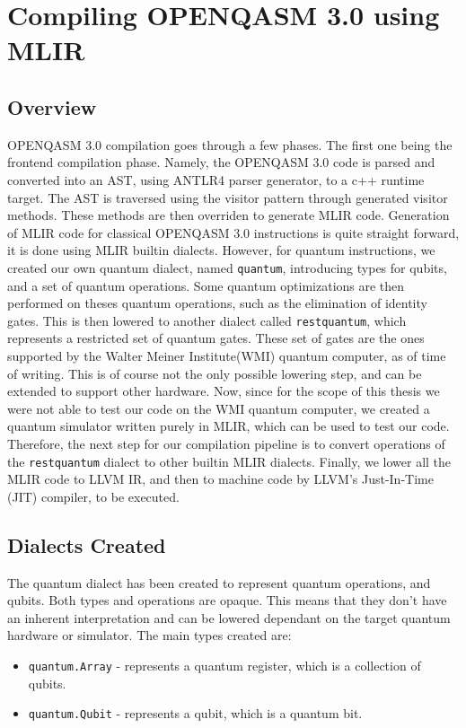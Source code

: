 \section{Compiling OPENQASM 3.0 using MLIR}
\subsection{Overview}
OPENQASM 3.0 compilation goes through a few phases.
The first one being the frontend compilation phase.
Namely, the OPENQASM 3.0 code is parsed and converted into an AST,
using ANTLR4 parser generator, to a c++ runtime target.
The AST is traversed using the visitor pattern through generated visitor methods.
These methods are then overriden to generate MLIR code.
Generation of MLIR code for classical OPENQASM 3.0 instructions is quite straight forward, it 
is done using MLIR builtin dialects. However, for quantum instructions, we created our 
own quantum dialect, named \texttt{quantum}, introducing types for qubits, and a set of quantum operations.
Some quantum optimizations are then performed on theses quantum operations, such as the elimination of identity gates.
This is then lowered to another dialect called \texttt{restquantum}, which represents a restricted set of quantum gates.
These set of gates are the ones supported by the Walter Meiner Institute(WMI) quantum computer, as of time of writing.
This is of course not the only possible lowering step, and can be extended to support other hardware.
Now, since for the scope of this thesis we were not able to test our code on the WMI quantum computer,
we created a quantum simulator written purely in MLIR, which can be used to test our code.
Therefore, the next step for our compilation pipeline is to convert operations of  
the \texttt{restquantum} dialect to other 
builtin MLIR dialects. Finally, we lower all the MLIR code to LLVM IR, 
and then to machine code by LLVM's Just-In-Time (JIT) compiler, to be executed.
\subsection{Dialects Created}
The quantum dialect has been created to represent quantum operations, and qubits.
Both types and operations are opaque. This means that they don't have an inherent 
interpretation and can be lowered dependant on the target quantum hardware or simulator.
The main types created are:
\begin{itemize}
    \item \texttt{quantum.Array} - represents a quantum register, which is a collection of qubits.
    \item \texttt{quantum.Qubit} - represents a qubit, which is a quantum bit.
\end{itemize}
